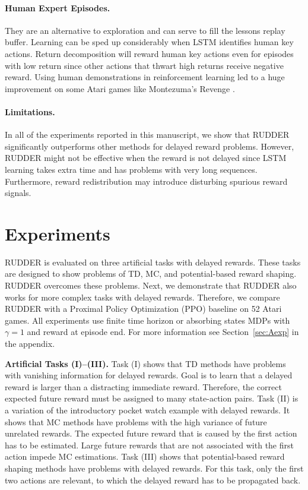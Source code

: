\documentclass{article}
\begin{document}
\paragraph{Human Expert Episodes.} They are an alternative to 
exploration and can 
serve to fill the lessons replay buffer.
Learning can be sped up considerably when LSTM identifies
human key actions.
Return decomposition will reward human key actions even for episodes
with low return since other actions that thwart high
returns receive negative reward.
Using human demonstrations in reinforcement learning
led to a huge improvement on some Atari
games like Montezuma's Revenge \cite{Pohlen:18,Aytar:18}.


\paragraph{Limitations.}
In all of the experiments reported in this manuscript, we show that RUDDER significantly outperforms other methods for delayed reward problems. However, RUDDER might not be effective when the reward is not delayed since LSTM learning takes extra time and has problems with very long sequences. Furthermore, reward redistribution may introduce disturbing spurious reward signals.

\section{Experiments}
\label{sec:Mexperiments}
RUDDER is evaluated on three artificial tasks with delayed rewards.
These tasks are designed to show problems of TD, MC, 
and potential-based reward shaping.
RUDDER overcomes these problems.
Next, we demonstrate that RUDDER also works for more complex tasks
with delayed rewards.
Therefore, we compare RUDDER with 
a Proximal Policy Optimization (PPO) baseline
on 52 Atari games. 
All experiments use finite time horizon or 
absorbing states MDPs with $\gamma=1$ and reward at episode end.
For more information see Section~\ref{sec:Aexp} in the appendix.

{\bf Artificial Tasks (I)--(III).} 
Task (I) shows that TD methods have problems with vanishing information 
for delayed rewards.
Goal is to learn that a delayed reward is
larger than a distracting immediate reward.
Therefore, the correct expected future reward must be  
assigned to many state-action pairs. 
Task (II) is a variation of the introductory pocket watch example
with delayed rewards.
It shows that MC methods have problems with the 
high variance of future unrelated rewards.
The expected future reward that is caused by the first action
has to be estimated.
Large future rewards that are not associated 
with the first action impede MC estimations. 
Task (III) shows that potential-based reward shaping methods have
problems with delayed rewards.
For this task, only the first two actions are relevant, to which
the delayed reward has to be propagated back.
\end{document}
